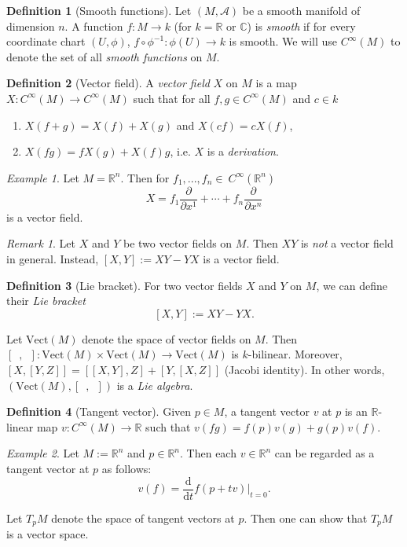 \documentclass[11pt]{amsart}
\numberwithin{equation}{section}
\theoremstyle{plain}
\theoremstyle{definition}
\newtheorem{defn}{Definition}[subsection]
\theoremstyle{remark}
\newtheorem{rem}{Remark}[subsection]
\newtheorem{ex}{Example}[subsection]
\newcommand{\R}{\mathbb{R}}
\newcommand{\dd}{{\mathrm{d}}}
\newcommand{\calA}{\mathcal{A}}
\begin{document}
\begin{defn}[Smooth functions]
Let $(M,\calA)$ be a smooth manifold of dimension $n$. A function $f\colon M\to k$ (for $k=\R$ or $\mathbb{C}$) is \emph{smooth} if for every coordinate chart $(U,\phi)$, $f\circ \phi^{-1}\colon \phi(U)\to k$ is smooth. We will use $C^\infty(M)$ to denote the set of all \emph{smooth functions} on $M$.
\end{defn}

\begin{defn}[Vector field]
A \emph{vector field} $X$ on $M$ is a map $X\colon C^\infty(M)\to C^{\infty}(M)$ such that for all $f,g\in C^\infty(M)$ and $c\in k$
\begin{enumerate}
\item{$X(f+g)=X(f)+X(g)$ and $X(cf)=cX(f)$,
}
\item{$X(fg)=fX(g)+X(f)g$, i.e. $X$ is a \emph{derivation}.
}
\end{enumerate}
\end{defn}

\begin{ex}
Let $M=\R^n$. Then for $f_1,...,f_n\in\ C^\infty(\R^n)$
$$X=f_1\frac{\partial}{\partial x^1}+\dotsm +f_n\frac{\partial}{\partial x^n}$$
is a vector field.
\end{ex}

\begin{rem}
Let $X$ and $Y$ be two vector fields on $M$. Then $XY$ is \emph{not} a vector field in general. Instead, $[X,Y]:=XY-YX$ is a vector field.
\end{rem}

\begin{defn}[Lie bracket]
For two vector fields $X$ and $Y$ on $M$, we can define their \emph{Lie bracket}
$$[X,Y]:=XY-YX.$$
\end{defn}

Let $\mathrm{Vect}(M)$ denote the space of vector fields on $M$. Then $[\enspace,\enspace]\colon \mathrm{Vect}(M)\times \mathrm{Vect}(M)\to \mathrm{Vect}(M)$ is $k$-bilinear. Moreover, $[X,[Y,Z]]=[[X,Y],Z]+[Y,[X,Z]]$ (Jacobi identity). In other words, $(\mathrm{Vect}(M),[\enspace,\enspace])$ is a \emph{Lie algebra}. 

\begin{defn}[Tangent vector]
Given $p\in M$, a tangent vector $v$ at $p$ is an $\R$-linear map $v\colon C^\infty(M)\to\R$ such that $v(fg)=f(p)v(g)+g(p)v(f)$.
\end{defn}

\begin{ex}
Let $M:=\R^n$ and $p\in\R^n$. Then each $v\in\R^n$ can be regarded as a tangent vector at $p$ as follows: 
$$v(f)=\frac{\dd}{\dd t}f(p+tv)\bigg|_{t=0}.$$
\end{ex}
Let $T_pM$ denote the space of tangent vectors at $p$. Then one can show that $T_pM$ is a vector space.
\end{document}
